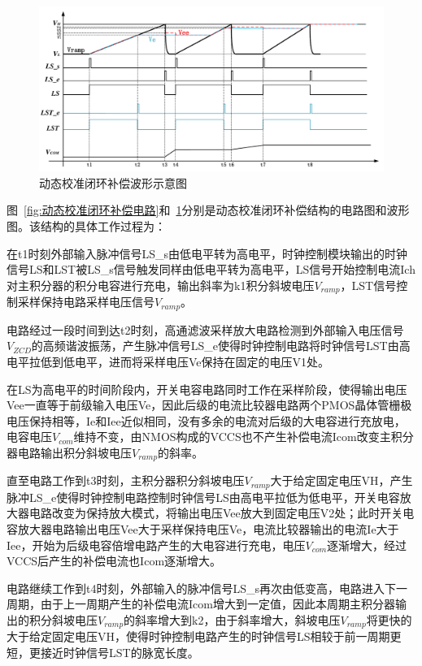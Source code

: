 \begin{figure}[htbp] 
    \centering
    \includegraphics[width=0.8\linewidth]{figures/主积分器环路波形图.pdf}
    \caption{动态校准闭环补偿波形示意图}
    \label{fig:动态校准闭环补偿波形图}
\end{figure} 

图~\ref{fig:动态校准闭环补偿电路}和~\ref{fig:动态校准闭环补偿波形图}分别是动态校准闭环补偿结构的电路图和波形图。该结构的具体工作过程为：

在t1时刻外部输入脉冲信号LS\_s由低电平转为高电平，时钟控制模块输出的时钟信号LS和LST被LS\_s信号触发同样由低电平转为高电平，LS信号开始控制电流Ich对主积分器的积分电容进行充电，输出斜率为k1积分斜坡电压$V_{ramp}$，LST信号控制采样保持电路采样电压信号$V_{ramp}$。

电路经过一段时间到达t2时刻，高通滤波采样放大电路检测到外部输入电压信号$V_{ZCD}$的高频谐波振荡，产生脉冲信号LS\_e使得时钟控制电路将时钟信号LST由高电平拉低到低电平，进而将采样电压Ve保持在固定的电压V1处。

在LS为高电平的时间阶段内，开关电容电路同时工作在采样阶段，使得输出电压Vee一直等于前级输入电压Ve，因此后级的电流比较器电路两个PMOS晶体管栅极电压保持相等，Ie和Iee近似相同，没有多余的电流对后级的大电容进行充放电，电容电压$V_{com}$维持不变，由NMOS构成的VCCS也不产生补偿电流Icom改变主积分器电路输出积分斜坡电压$V_{ramp}$的斜率。

直至电路工作到t3时刻，主积分器积分斜坡电压$V_{ramp}$大于给定固定电压VH，产生脉冲LS\_e使得时钟控制电路控制时钟信号LS由高电平拉低为低电平，开关电容放大器电路改变为保持放大模式，将输出电压Vee放大到固定电压V2处；此时开关电容放大器电路输出电压Vee大于采样保持电压Ve，电流比较器输出的电流Ie大于Iee，开始为后级电容倍增电路产生的大电容进行充电，电压$V_{com}$逐渐增大，经过VCCS后产生的补偿电流也Icom逐渐增大。

电路继续工作到t4时刻，外部输入的脉冲信号LS\_s再次由低变高，电路进入下一周期，由于上一周期产生的补偿电流Icom增大到一定值，因此本周期主积分器输出的积分斜坡电压$V_{ramp}$的斜率增大到k2，由于斜率增大，斜坡电压$V_{ramp}$将更快的大于给定固定电压VH，使得时钟控制电路产生的时钟信号LS相较于前一周期更短，更接近时钟信号LST的脉宽长度。

